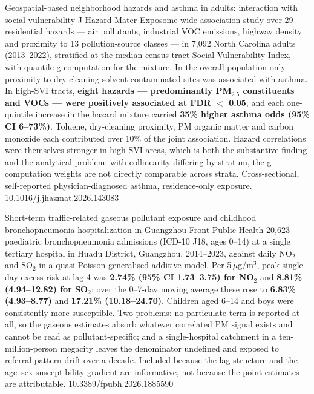 \documentclass[10pt]{article}
\begin{document}
{Geospatial-based neighborhood hazards and asthma in adults: interaction with social
vulnerability}
{J Hazard Mater}
{Exposome-wide association study over 29 residential hazards --- air pollutants,
industrial VOC emissions, highway density and proximity to 13 pollution-source classes
--- in 7,092 North Carolina adults (2013--2022), stratified at the median census-tract
Social Vulnerability Index, with quantile g-computation for the mixture. In the overall
population only proximity to dry-cleaning-solvent-contaminated sites was associated with
asthma. In high-SVI tracts, \textbf{eight hazards --- predominantly PM$_{2.5}$
constituents and VOCs --- were positively associated at FDR $<$ 0.05}, and each
one-quintile increase in the hazard mixture carried \textbf{35\% higher asthma odds
(95\% CI 6--73\%)}. Toluene, dry-cleaning proximity, PM organic matter and carbon
monoxide each contributed over 10\% of the joint association. Hazard correlations were
themselves stronger in high-SVI areas, which is both the substantive finding and the
analytical problem: with collinearity differing by stratum, the g-computation weights are
not directly comparable across strata. Cross-sectional, self-reported
physician-diagnosed asthma, residence-only exposure.}
{10.1016/j.jhazmat.2026.143083}


{Short-term traffic-related gaseous pollutant exposure and childhood bronchopneumonia
hospitalization in Guangzhou}
{Front Public Health}
{20,623 paediatric bronchopneumonia admissions (ICD-10 J18, ages 0--14) at a single
tertiary hospital in Huadu District, Guangzhou, 2014--2023, against daily NO$_2$ and
SO$_2$ in a quasi-Poisson generalised additive model. Per 5\,$\mu$g/m$^3$, peak
single-day excess risk at lag 4 was \textbf{2.74\% (95\% CI 1.73--3.75) for NO$_2$} and
\textbf{8.81\% (4.94--12.82) for SO$_2$}; over the 0--7-day moving average these rose to
\textbf{6.83\% (4.93--8.77)} and \textbf{17.21\% (10.18--24.70)}. Children aged 6--14 and
boys were consistently more susceptible. Two problems: no particulate term is reported at
all, so the gaseous estimates absorb whatever correlated PM signal exists and cannot be
read as pollutant-specific; and a single-hospital catchment in a ten-million-person
megacity leaves the denominator undefined and exposed to referral-pattern drift over a
decade. Included because the lag structure and the age--sex susceptibility gradient are
informative, not because the point estimates are attributable.}
{10.3389/fpubh.2026.1885590}
\end{document}
